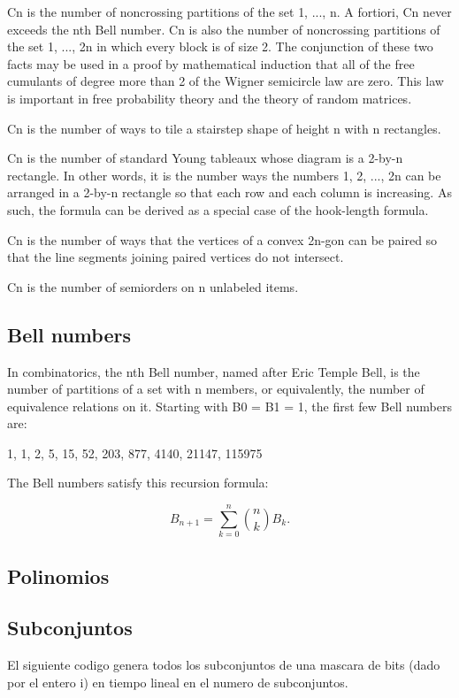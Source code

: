 \documentclass[10pt,letterpaper,twocolumn,twosided]{article}
\newcommand{\codigofuente}[1]{

\dotfill
}
\begin{document}
Cn is the number of noncrossing partitions of the set {1, ..., n}. A fortiori, Cn never exceeds the nth Bell number. Cn is also the number of noncrossing partitions of the set {1, ..., 2n} in which every block is of size 2. The conjunction of these two facts may be used in a proof by mathematical induction that all of the free cumulants of degree more than 2 of the Wigner semicircle law are zero. This law is important in free probability theory and the theory of random matrices.

Cn is the number of ways to tile a stairstep shape of height n with n rectangles.

Cn is the number of standard Young tableaux whose diagram is a 2-by-n rectangle. In other words, it is the number ways the numbers 1, 2, ..., 2n can be arranged in a 2-by-n rectangle so that each row and each column is increasing. As such, the formula can be derived as a special case of the hook-length formula.

Cn is the number of ways that the vertices of a convex 2n-gon can be paired so that the line segments joining paired vertices do not intersect.

Cn is the number of semiorders on n unlabeled items.

\subsection{Bell numbers}

In combinatorics, the nth Bell number, named after Eric Temple Bell, is the number of partitions of a set with n members, or equivalently, the number of equivalence relations on it. Starting with B0 = B1 = 1, the first few Bell numbers are:

1, 1, 2, 5, 15, 52, 203, 877, 4140, 21147, 115975

The Bell numbers satisfy this recursion formula:

$$B_{n+1}=\sum_{k=0}^{n}{{n \choose k}B_k}.$$

\subsection{Polinomios}

\codigofuente{src/misc/polynomials.cpp}

\subsection{Subconjuntos}

El siguiente codigo genera todos los subconjuntos de una mascara de bits (dado por el entero i) en tiempo lineal en el numero de subconjuntos.
\end{document}
